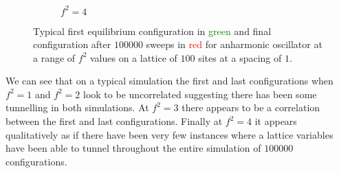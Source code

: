 \documentclass[12pt]{article}
\begin{document}
\begin{figure}
\begin{subfigure}[b]{0.5\textwidth}
                        \caption{$f^2=4$}
                        \label{fig:initialfinalf4}
                        \vspace{4ex}
                    \end{subfigure}
                    \caption{Typical first equilibrium configuration in \textcolor{green}{green} and final configuration after $100000$ sweeps in \textcolor{red}{red} for anharmonic oscillator at a range of $f^2$ values on a lattice of $100$ sites at a spacing of $1$.}
                    \label{fig:IntialFinalConfigurations}
                \end{figure} 


        

                

        We can see that on a typical simulation the first and last configurations when $f^2=1$ and $f^2=2$ look to be uncorrelated suggesting there has been some tunnelling in both simulations. At $f^2=3$ there appears to be a correlation between the first and last configurations. Finally at $f^2=4$ it appears qualitatively as if there have been very few instances where a lattice variables have been able to tunnel throughout the entire simulation of $100000$ configurations.
\end{document}
